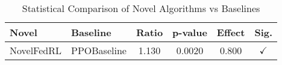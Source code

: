 \begin{table}[htbp]
\centering
\caption{Statistical Comparison of Novel Algorithms vs Baselines}
\label{tab:statistical_comparison}
\begin{tabular}{|l|l|c|c|c|c|}
\hline
\textbf{Novel} & \textbf{Baseline} & \textbf{Ratio} & \textbf{p-value} & \textbf{Effect} & \textbf{Sig.} \\
\hline
NovelFedRL & PPOBaseline & 1.130 & 0.0020 & 0.800 & $\checkmark$ \\
\hline
\end{tabular}
\end{table}